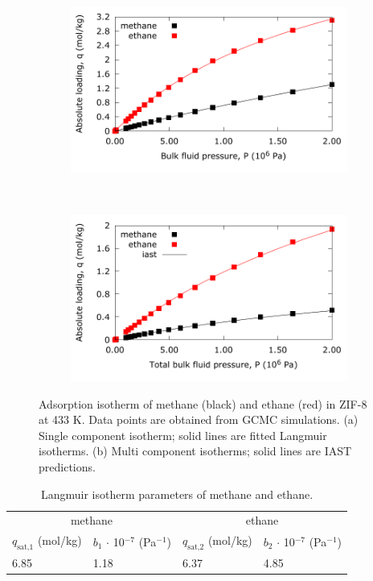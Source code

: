 \documentclass{article}
\begin{document}
\begin{figure}[t!]
\centering
\begin{subfigure}[h]{0.5\textwidth}
\centering
\includegraphics[width=1.0\textwidth]{./../data/singlecomponent_zif_methane_ethane_433K.pdf}
\subcaption{}
\end{subfigure}~
\begin{subfigure}[h]{0.5\textwidth}
\centering
\includegraphics[width=1.0\textwidth]{./../data/multicomponent_zif_methane_ethane_433K.pdf}
\subcaption{}
\end{subfigure}
\caption{Adsorption isotherm of methane (black) and ethane (red) in ZIF-8 at 433 K. Data points are obtained from GCMC simulations. (a) Single component isotherm; solid lines are fitted Langmuir isotherms. (b) Multi component isotherms; solid lines are IAST predictions.}
\label{fig:single_component_isotherms}
\end{figure}

\begin{table}[b!]
\centering
\caption{Langmuir isotherm parameters of methane and ethane.}
\label{tab:isotherm_parameters}
\begin{tabular}{l l l l}
\toprule
\multicolumn{2}{c}{methane} & \multicolumn{2}{c}{ethane}\\
$q_\text{sat,1}$ (mol/kg) & $b_1$ $\cdot$ 10$^{-7}$ (Pa$^{-1}$) & $q_\text{sat,2}$ (mol/kg) & $b_2$  $\cdot$ 10$^{-7}$ (Pa$^{-1}$) \\
\midrule
6.85 & 1.18 & 6.37 & 4.85 \\
\bottomrule
\end{tabular}
\end{table}
\end{document}
